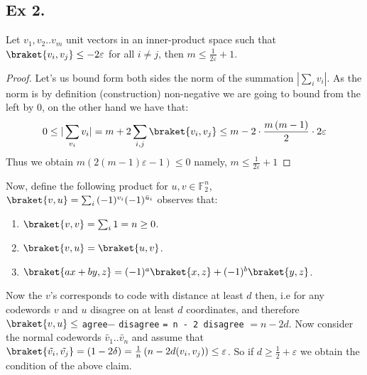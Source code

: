 \documentclass{article}
\newcommand{\FF}{\mathbb{F}}
\begin{document}
\begin{multicols*}{2}
\section{Ex 2.}
\begin{claim}
  Let $v_{1},v_{2} .. v_{m}$ unit vectors in an inner-product space such that  $\braket{v_{i}, v_{j}} \le -2\varepsilon $ for all $i\neq j$, then $m \le \frac{1}{2\varepsilon}+1$.
\end{claim}
\begin{proof}
  Let's us bound form both sides the norm of the summation $|\sum_{i}{v_{i}}|$. As the norm is by definition (construction) non-negative we are going to bound from the left by $0$, on the other hand we have that: 
  \begin{equation*}
    \begin{split}
      0 \le |\sum_{v_{i}}{v_{i}}| = m + 2\sum_{i,j}{\braket{v_{i},v_{j}}} \le m - 2 \cdot \frac{m\left( m-1 \right)}{2} \cdot 2\varepsilon  
    \end{split}
  \end{equation*}
  Thus we obtain $ m\left( 2(m-1)\varepsilon - 1  \right) \le 0 $ namely, $m \le \frac{1}{2\varepsilon} + 1$   
\end{proof}
Now, define the following product for $u,v \in \FF_{2}^{n} $, $\braket{v,u} = \sum_{i}{ (-1)^{v_{i}} (-1)^{\bar{u}_{i}}  }$ observes that: 
\begin{enumerate}
  \item $\braket{v,v} = \sum_{i}{ 1  } = n \ge 0 $.
  \item $\braket{v,u} = \braket{u,v}$.
  \item $\braket{ax + by,z} = (-1)^{a}\braket{x,z} + (-1)^{b}\braket{y,z}$. 
\end{enumerate}

Now the $v$'s corresponds to code with distance at least $d$ then, i.e for any codewords $v$ and $u$ disagree on at least $d$ coordinates, and therefore $\braket{v,u} \le$ \verb|agree|$-$ \verb|disagree| \verb|= n - 2 disagree| $=n -2d$. Now consider the normal codewords $\tilde{v_{1}} .. \tilde{v_{n}}$ and assume that $ \braket{ \tilde{v_{i}},\tilde{v_{j}}} = \left(1 - 2\delta \right)= \frac{1}{n}\left( n -2 d(v_{i},v_{j}) \right) \le  \varepsilon$. So if $d \ge \frac{1}{2} + \varepsilon$ we obtain the condition of the above claim. 


\end{multicols*}
\end{document}
